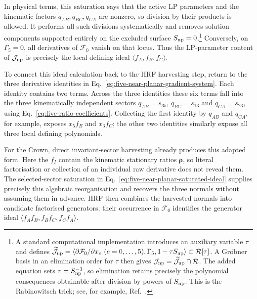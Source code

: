 \documentclass[a4paper,11pt]{article}
\begin{document}
In physical terms, this saturation says that the active LP parameters
and the kinematic factors \(q_{AB},q_{BC},q_{CA}\) are nonzero, so division
by their products is allowed.  It performs all such divisions systematically
and removes solution components supported entirely on the excluded surface
\(S_{\rm np}=0\).\footnote{A standard computational implementation introduces
an auxiliary variable \(\tau\) and defines
\(\widetilde{\mathcal J}_{\rm np}
 =\langle\partial\mathcal F_0/\partial x_e\ (e=0,\ldots,5),
 \Gamma_5,1-\tau S_{\rm np}\rangle\subset\mathcal R[\tau]\).
A Gr\"obner basis in an elimination order for \(\tau\) then gives
\(\mathcal J_{\rm np}=\widetilde{\mathcal J}_{\rm np}\cap\mathcal R\).
The added equation sets \(\tau=S_{\rm np}^{-1}\), so elimination retains
precisely the polynomial consequences obtainable after division by powers of
\(S_{\rm np}\).  This is the Rabinowitsch trick; see, for example,
Ref.~\cite{Cox:2015iva}.}
Conversely, on \(\Gamma_5=0\),
all derivatives of \(\mathcal F_0\) vanish on that locus.  Thus the
LP-parameter content of \(\mathcal J_{\rm np}\) is precisely the
local defining ideal \(\langle f_A,f_B,f_C\rangle\).

To connect this ideal calculation back to the HRF harvesting step, return to
the three derivative identities in
Eq.~\eqref{eq:five-near-planar-gradient-system}.  Each identity contains two
terms.  Across the three identities these six terms fall into the three
kinematically independent sectors
\(q_{AB}=s_{35}\), \(q_{BC}=s_{13}\) and \(q_{CA}=s_{23}\), using
Eq.~\eqref{eq:five-ratio-coefficients}.  Collecting the first identity by
\(q_{AB}\) and \(q_{CA}\), for example, exposes \(x_5f_B\) and \(x_3f_C\);
the other two identities similarly expose all three local defining polynomials.

For the Crown, direct invariant-sector harvesting already produces this
adapted form.  Here the \(f_I\) contain the kinematic stationary ratios
\(\boldsymbol\rho\), so literal factorisation or collection of an individual
raw derivative does not reveal them.  The selected-sector saturation in
Eq.~\eqref{eq:five-near-planar-saturated-ideal} supplies precisely this
algebraic reorganisation and recovers the three normals without assuming
them in advance.  HRF then combines the harvested normals into candidate
factorised generators; their occurrence in \(\mathcal F_0\) identifies the
generator ideal
\(\langle f_Af_B,f_Bf_C,f_Cf_A\rangle\).
\end{document}
